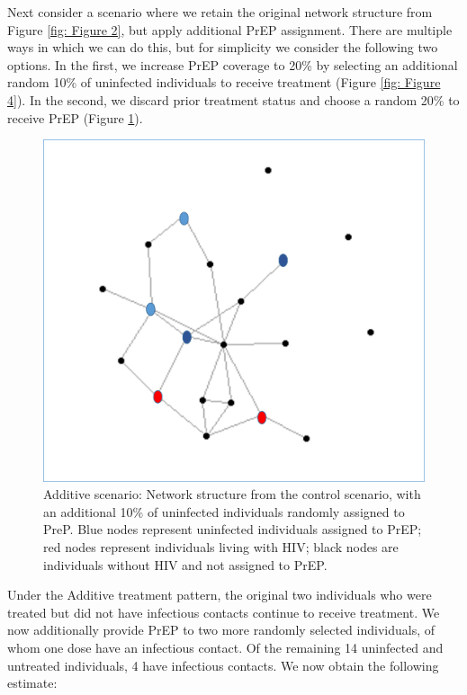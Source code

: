 \documentclass{article}
\theoremstyle{definition}
\begin{document}
Next consider a scenario where we retain the original network structure from Figure \ref{fig: Figure 2}, but apply additional PrEP assignment. There are multiple ways in which we can do this, but for simplicity we consider the following two options. In the first, we increase PrEP coverage to 20\% by selecting an additional random 10\% of uninfected individuals to receive treatment (Figure \ref{fig: Figure 4}). In the second, we discard prior treatment status and choose a random 20\% to receive PrEP (Figure \ref{fig: Figure 5}).


\begin{figure}[H]
    \centering
    \includegraphics[scale=0.5]{Original Figures/Network Example 4.png}
    \caption{Additive scenario: Network structure from the control scenario, with an additional 10\%  of uninfected individuals randomly assigned to PreP. Blue nodes represent uninfected individuals assigned to PrEP; red nodes represent individuals living with HIV; black nodes are individuals without HIV and not assigned to PrEP.}
    \label{fig: Figure 5}
\end{figure}

Under the Additive treatment pattern, the original two individuals who were treated but did not have infectious contacts continue to receive treatment. We now additionally provide PrEP to two more randomly selected individuals, of whom one dose have an infectious contact. Of the remaining 14 uninfected and untreated individuals, 4 have infectious contacts. We now obtain the following estimate: 
\end{document}
